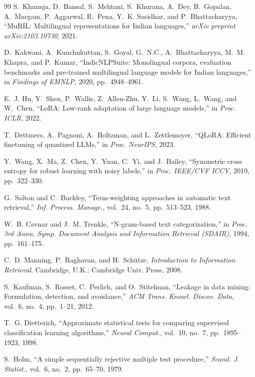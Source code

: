 \documentclass[10pt,conference]{IEEEtran}
\begin{document}
\begin{thebibliography}{99}
S.~Khanuja, D.~Bansal, S.~Mehtani, S.~Khurana, A.~Dey, B.~Gopalan, A.~Margam, P.~Aggarwal, R.~Pena, Y.~K. Sasidhar, and P.~Bhattacharyya, ``MuRIL: Multilingual representations for Indian languages,'' \emph{arXiv preprint arXiv:2103.10730}, 2021.

D.~Kakwani, A.~Kunchukuttan, S.~Goyal, G.~N.C., A.~Bhattacharyya, M.~M. Khapra, and P.~Kumar, ``IndicNLPSuite: Monolingual corpora, evaluation benchmarks and pre-trained multilingual language models for Indian languages,'' in \emph{Findings of EMNLP}, 2020, pp.~4948--4961.

E.~J. Hu, Y.~Shen, P.~Wallis, Z.~Allen-Zhu, Y.~Li, S.~Wang, L.~Wang, and W.~Chen, ``LoRA: Low-rank adaptation of large language models,'' in \emph{Proc. ICLR}, 2022.

T.~Dettmers, A.~Pagnoni, A.~Holtzman, and L.~Zettlemoyer, ``QLoRA: Efficient finetuning of quantized LLMs,'' in \emph{Proc. NeurIPS}, 2023.

Y.~Wang, X.~Ma, Z.~Chen, Y.~Yuan, C.~Yi, and J.~Bailey, ``Symmetric cross entropy for robust learning with noisy labels,'' in \emph{Proc. IEEE/CVF ICCV}, 2019, pp.~322--330.

G.~Salton and C.~Buckley, ``Term-weighting approaches in automatic text retrieval,'' \emph{Inf. Process. Manage.}, vol.~24, no.~5, pp.~513--523, 1988.

W.~B. Cavnar and J.~M. Trenkle, ``N-gram-based text categorization,'' in \emph{Proc. 3rd Annu. Symp. Document Analysis and Information Retrieval (SDAIR)}, 1994, pp.~161--175.

C.~D. Manning, P.~Raghavan, and H.~Sch\"utze, \emph{Introduction to Information Retrieval}. Cambridge, U.K.: Cambridge Univ. Press, 2008.

S.~Kaufman, S.~Rosset, C.~Perlich, and O.~Stitelman, ``Leakage in data mining: Formulation, detection, and avoidance,'' \emph{ACM Trans. Knowl. Discov. Data}, vol.~6, no.~4, pp.~1--21, 2012.

T.~G. Dietterich, ``Approximate statistical tests for comparing supervised classification learning algorithms,'' \emph{Neural Comput.}, vol.~10, no.~7, pp.~1895--1923, 1998.

S.~Holm, ``A simple sequentially rejective multiple test procedure,'' \emph{Scand. J. Statist.}, vol.~6, no.~2, pp.~65--70, 1979.


\end{thebibliography}
\end{document}
